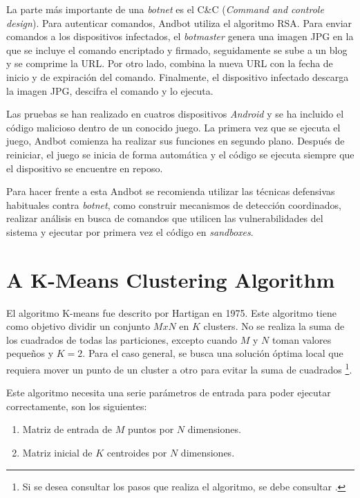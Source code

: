 \documentclass[a4paper,11pt]{report}
\begin{document}
La parte más importante de una \emph{botnet} es el C\&{}C (\emph{Command and controle design}). Para autenticar comandos, Andbot utiliza el algoritmo RSA. Para enviar comandos a los dispositivos infectados, el \emph{botmaster} genera una imagen JPG en la que se incluye el comando encriptado y firmado, seguidamente se sube a un blog y se comprime la URL. Por otro lado, combina la nueva URL con la fecha de inicio y de expiración del comando. Finalmente, el dispositivo infectado descarga la imagen JPG, descifra el comando y lo ejecuta.

Las pruebas se han realizado en cuatros dispositivos \emph{Android} y se ha incluido el código malicioso dentro de un conocido juego. La primera vez que se ejecuta el juego, Andbot comienza ha realizar sus funciones en segundo plano. Después de reiniciar, el juego se inicia de forma automática y el código se ejecuta siempre que el dispositivo se encuentre en reposo.

Para hacer frente a esta Andbot se recomienda utilizar las técnicas defensivas habituales contra \emph{botnet}, como construir mecanismos de detección coordinados, realizar análisis en busca de comandos que utilicen las vulnerabilidades del sistema y ejecutar por primera vez el código en \emph{sandboxes}.

\section{A K-Means Clustering Algorithm}

El algoritmo K-means \cite{k-means} fue descrito por Hartigan en 1975. Este algoritmo tiene como objetivo dividir un conjunto $MxN$ en $K$ clusters. No se realiza la suma de los cuadrados de todas las particiones, excepto cuando $M$ y $N$ toman valores pequeños y $K=2$. Para el caso general, se busca una solución óptima local que requiera mover un punto de un cluster a otro para evitar la suma de cuadrados \footnote{Si se desea consultar los pasos que realiza el algoritmo, se debe consultar \cite{k-means}.}.

Este algoritmo necesita una serie parámetros de entrada para poder ejecutar correctamente, son los siguientes:

\begin{enumerate}
\item Matriz de entrada de $M$ puntos por $N$ dimensiones.
\item Matriz inicial de $K$ centroides por $N$ dimensiones.
\end{enumerate}
\end{document}
